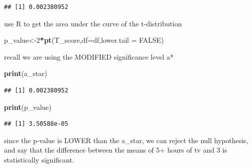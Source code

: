 \documentclass[
]{article}
\newenvironment{Shaded}{\begin{snugshade}}{\end{snugshade}}
\newcommand{\DataTypeTok}[1]{\textcolor[rgb]{0.13,0.29,0.53}{#1}}
\newcommand{\DecValTok}[1]{\textcolor[rgb]{0.00,0.00,0.81}{#1}}
\newcommand{\KeywordTok}[1]{\textcolor[rgb]{0.13,0.29,0.53}{\textbf{#1}}}
\newcommand{\NormalTok}[1]{#1}
\newcommand{\OperatorTok}[1]{\textcolor[rgb]{0.81,0.36,0.00}{\textbf{#1}}}
\newcommand{\OtherTok}[1]{\textcolor[rgb]{0.56,0.35,0.01}{#1}}
\begin{document}
\begin{verbatim}
## [1] 0.002380952
\end{verbatim}

use R to get the area under the curve of the t-distribution

\begin{Shaded}
\begin{Highlighting}[]
\NormalTok{p_value<-}\DecValTok{2}\OperatorTok{*}\KeywordTok{pt}\NormalTok{(T_score,}\DataTypeTok{df=}\NormalTok{df,}\DataTypeTok{lower.tail =} \OtherTok{FALSE}\NormalTok{)}
\end{Highlighting}
\end{Shaded}

recall we are using the MODIFIED significance level a*

\begin{Shaded}
\begin{Highlighting}[]
\KeywordTok{print}\NormalTok{(a_star)}
\end{Highlighting}
\end{Shaded}

\begin{verbatim}
## [1] 0.002380952
\end{verbatim}

\begin{Shaded}
\begin{Highlighting}[]
\KeywordTok{print}\NormalTok{(p_value)}
\end{Highlighting}
\end{Shaded}

\begin{verbatim}
## [1] 3.50588e-05
\end{verbatim}

since the p-value is LOWER than the a\_star, we can reject the null
hypothesis, and say that the difference between the means of 5+ hours of
tv and 3 is statistically significant.
\end{document}
